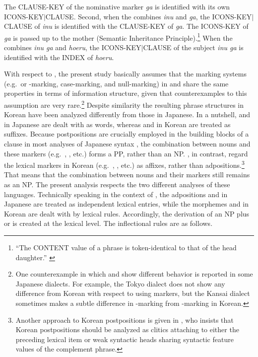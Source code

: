 \noindent The CLAUSE-KEY of the nominative marker \textit{ga} is
identified with its own
ICONS-KEY\ensuremath{\mid}CLAUSE. Second,
when the  combines \textit{inu} and \textit{ga},
the ICONS-KEY\ensuremath{\mid}CLAUSE of \textit{inu} is identified
with the CLAUSE-KEY of \textit{ga}. The ICONS-KEY of \textit{ga} is
passed up to the mother (Semantic Inheritance
Principle).\footnote{``The CONTENT value of a phrase is
  token-identical to that of the head daughter.''
  \citep[48]{pollard:sag:94} } When the 
combines \textit{inu ga} and \textit{hoeru}, the
ICONS-KEY\ensuremath{\mid}CLAUSE of the subject \textit{inu ga} is
identified with the INDEX of \textit{hoeru}.



With respect to , the present study basically assumes that
the marking systems (e.g.\ \wa or \onun-marking, case-marking, and
null-marking) in  and  share the same
properties in terms of information structure, given that
counterexamples to this assumption are very rare.\footnote{One
  counterexample in which \wa and \nun show different behavior is
  reported in some Japanese dialects. For example, the Tokyo dialect
  does not show any difference from Korean with respect to using
   markers, but the Kansai dialect sometimes makes a subtle
  difference in \wa-marking from \onun-marking in Korean.} Despite
similarity the resulting phrase structures in Korean have been
analyzed differently from those in Japanese. In a nutshell, \ga and
\wa in Japanese are dealt with as words, whereas \ika and \nun in
Korean are treated as suffixes.  Because postpositions are crucially
employed in the building blocks of a clause in most analyses of
Japanese syntax \citep{sato:tam:12}, the combination between nouns and
these markers (e.g.\ \ga, \wa, etc.)  forms a PP, rather than an
NP. \citet{kim:yang:04}, in contrast, regard the
lexical markers in Korean (e.g.\ \ika, \nun, etc.) as affixes, rather
than adpositions.\footnote{Another approach to Korean postpositions is
  given in \citet{ko:08}, who insists that Korean postpositions should
  be analyzed as clitics attaching to either the preceding lexical
  item or weak syntactic heads sharing syntactic feature values of the
  complement phrase.}  That means that the combination between nouns
and their markers still remains as an NP. The present analysis
respects the two different analyses of these languages. Technically
speaking in the context of , the adpositions
\ga and \wa in Japanese are treated as independent lexical entries,
while the morphemes \ika and \nun in Korean are dealt with by lexical
rules.  Accordingly, the derivation of an NP plus \ika or \nun is
created at the lexical level.  The inflectional rules are as follows.


